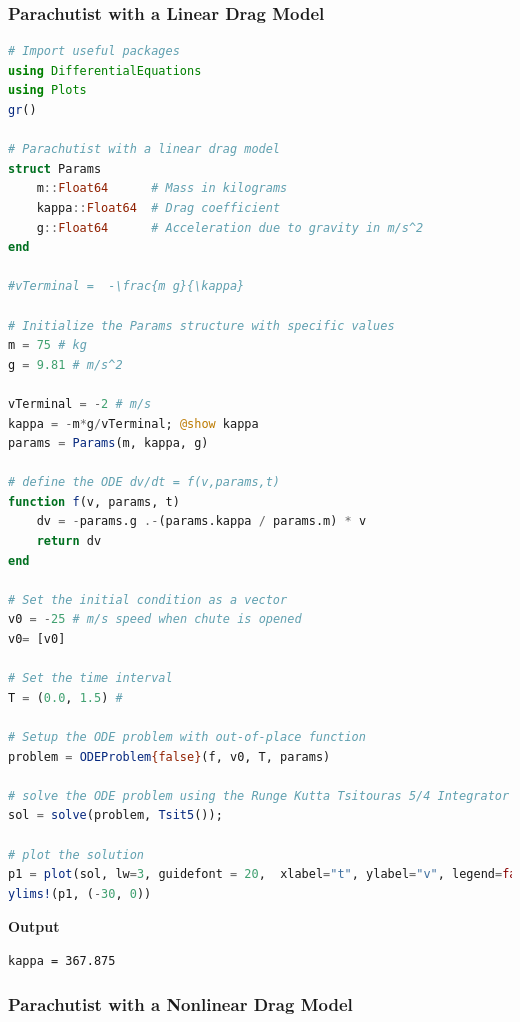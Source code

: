\subsubsection{Parachutist with a Linear Drag Model}
\begin{lstlisting}[language=Julia,style=mystyle]
# Import useful packages
using DifferentialEquations
using Plots 
gr()

# Parachutist with a linear drag model
struct Params
    m::Float64      # Mass in kilograms
    kappa::Float64  # Drag coefficient
    g::Float64      # Acceleration due to gravity in m/s^2
end

#vTerminal =  -\frac{m g}{\kappa}

# Initialize the Params structure with specific values
m = 75 # kg
g = 9.81 # m/s^2

vTerminal = -2 # m/s
kappa = -m*g/vTerminal; @show kappa
params = Params(m, kappa, g)

# define the ODE dv/dt = f(v,params,t)
function f(v, params, t)
    dv = -params.g .-(params.kappa / params.m) * v
    return dv
end

# Set the initial condition as a vector
v0 = -25 # m/s speed when chute is opened
v0= [v0]

# Set the time interval
T = (0.0, 1.5) # 

# Setup the ODE problem with out-of-place function
problem = ODEProblem{false}(f, v0, T, params)

# solve the ODE problem using the Runge Kutta Tsitouras 5/4 Integrator
sol = solve(problem, Tsit5());

# plot the solution
p1 = plot(sol, lw=3, guidefont = 20,  xlabel="t", ylabel="v", legend=false, color=:blue)
ylims!(p1, (-30, 0))
\end{lstlisting}
\textbf{Output} 
\begin{verbatim}
kappa = 367.875
\end{verbatim}



\subsubsection{Parachutist with a Nonlinear Drag Model}

